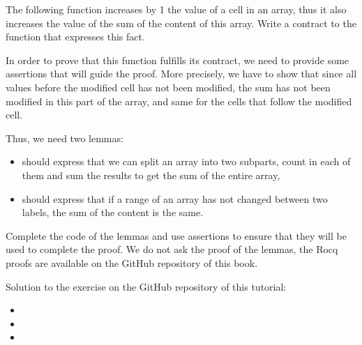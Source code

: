 The following function increases by 1 the value of a cell in an array, thus it
also increases the value of the sum of the content of this array. Write a
contract to the function that expresses this fact.




In order to prove that this function fulfills its contract, we need to provide
some assertions that will guide the proof. More precisely, we have to show that
since all values before the modified cell has not been modified, the sum has not
been modified in this part of the array, and same for the cells that follow the
modified cell.


Thus, we need two lemmas:
\begin{itemize}
\item {} should express that we can split an array into
  two subparts, count in each of them and sum the results to get the sum of the
  entire array,
\item {} should express that if a range of an array has
  not changed between two labels, the sum of the content is the same.
\end{itemize}

Complete the code of the lemmas and use assertions to ensure that they will be
used to complete the proof. We do not ask the proof of the lemmas, the Rocq
proofs are available on the GitHub repository of this book.


\begin{Information}
  Solution to the exercise on the GitHub repository of this tutorial:
  \begin{itemize}
    \item {}
    \item {}
    \item {}
  \end{itemize}
\end{Information}
